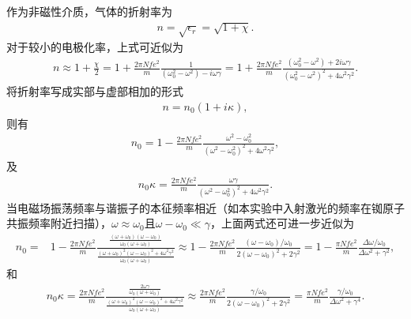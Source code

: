 \documentclass{assignment}
\begin{document}
作为非磁性介质，气体的折射率为
\begin{align}
    n=\sqrt{\epsilon_r}=\sqrt{1+\chi}.
\end{align}
对于较小的电极化率，上式可近似为
\begin{align}
    n\approx 1+\frac{\chi}{2}=1+\frac{2\pi Nfe^2}{m}\frac{1}{(\omega_0^2-\omega^2)-i\omega\gamma}=1+\frac{2\pi Nfe^2}{m}\frac{(\omega_0^2-\omega^2)+2i\omega\gamma}{(\omega_0^2-\omega^2)^2+4\omega^2\gamma^2}.
\end{align}
将折射率写成实部与虚部相加的形式
\begin{align}
    n=n_0(1+i\kappa),
\end{align}
则有
\begin{align}
    n_0=1-\frac{2\pi Nfe^2}{m}\frac{\omega^2-\omega_0^2}{(\omega^2-\omega_0^2)^2+4\omega^2\gamma^2},
\end{align}
及
\begin{align}
    n_0\kappa=\frac{2\pi Nfe^2}{m}\frac{\omega\gamma}{(\omega^2-\omega_0^2)^2+4\omega^2\gamma^2}.
\end{align}
当电磁场振荡频率与谐振子的本征频率相近（如本实验中入射激光的频率在铷原子共振频率附近扫描），$\omega\approx\omega_0$且$\omega-\omega_0\ll\gamma$，上面两式还可进一步近似为
\begin{align}
    n_0=&1-\frac{2\pi Nfe^2}{m}\frac{\frac{(\omega+\omega_0)(\omega-\omega_0)}{\omega_0(\omega+\omega_0)}}{\frac{(\omega+\omega_0)^2(\omega-\omega_0)^2+4\omega^2\gamma^2}{\omega_0(\omega+\omega_0)}}\approx 1-\frac{2\pi Nfe^2}{m}\frac{(\omega-\omega_0)/\omega_0}{2(\omega-\omega_0)^2+2\gamma^2}=1-\frac{\pi Nfe^2}{m}\frac{\Delta\omega/\omega_0}{\Delta\omega^2+\gamma^2},
\end{align}
和
\begin{align}
    n_0\kappa=\frac{2\pi Nfe^2}{m}\frac{\frac{2\omega\gamma}{\omega_0(\omega+\omega_0)}}{\frac{(\omega+\omega_0)^2(\omega-\omega_0)^2+4\omega^2\gamma^2}{\omega_0(\omega+\omega_0)}}\approx\frac{2\pi Nfe^2}{m}\frac{\gamma/\omega_0}{2(\omega-\omega_0)^2+2\gamma^2}=\frac{\pi Nfe^2}{m}\frac{\gamma/\omega_0}{\Delta\omega^2+\gamma^4}.
\end{align}
\end{document}

